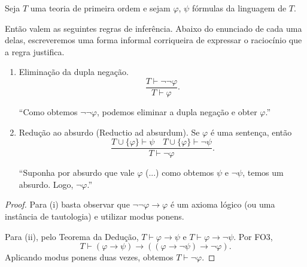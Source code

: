\begin{metaproposition}\label{mprop:regrasProposicionaisNegacao}
    Seja $T$ uma teoria de primeira ordem e sejam $\varphi$, $\psi$ fórmulas da linguagem de $T$.

    Então valem as seguintes regras de inferência.
    Abaixo do enunciado de cada uma delas, escreveremos uma forma informal corriqueira de expressar o raciocínio que a regra justifica.

    \begin{enumerate}[label=(\roman*)]
        \item Eliminação da dupla negação.
        \[
            \frac{T\vdash \neg\neg\varphi}
                 {T\vdash \varphi}.
        \]
        
        ``Como obtemos $\neg\neg\varphi$, podemos eliminar a dupla negação e obter $\varphi$.''

        \item Redução ao absurdo (Reductio ad absurdum). Se $\varphi$ é uma sentença, então
        \[
            \frac{T\cup\{\varphi\}\vdash \psi \quad T\cup\{\varphi\}\vdash \neg\psi}
                 {T\vdash \neg\varphi}.
        \]

        ``Suponha por absurdo que vale $\varphi$ (...) como obtemos $\psi$ e $\neg\psi$, temos um absurdo.
        Logo, $\neg\varphi$.''
    \end{enumerate}
\end{metaproposition}

\begin{proof}
    Para (i) basta observar que $\neg\neg\varphi\rightarrow\varphi$ é um axioma lógico (ou uma instância de tautologia) e utilizar modus ponens.

    Para (ii), pelo Teorema da Dedução, $T\vdash \varphi\rightarrow\psi$ e $T\vdash \varphi\rightarrow\neg\psi$.
    Por FO3,
    \[
        T\vdash
        (\varphi\rightarrow\psi)
        \rightarrow
        ((\varphi\rightarrow\neg\psi)\rightarrow\neg\varphi).
    \]
    Aplicando modus ponens duas vezes, obtemos $T\vdash \neg\varphi$.
\end{proof}

